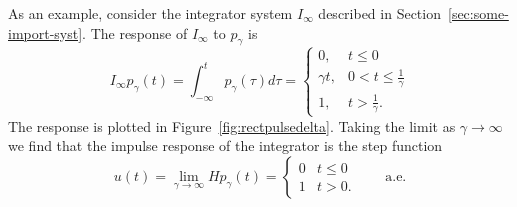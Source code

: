 
As an example, consider the integrator system $I_\infty$ described in Section~\ref{sec:some-import-syst}.  The response of $I_\infty$ to $p_\gamma$ is 
\[
I_\infty p_\gamma(t) = \int_{-\infty}^{t} p_\gamma(\tau) d\tau = \begin{cases}
0, & t \leq 0 \\
\gamma t, & 0 < t \leq \frac{1}{\gamma} \\
1, & t > \frac{1}{\gamma}.
\end{cases}
\]
The response is plotted in Figure~\ref{fig:rectpulsedelta}.  Taking the limit as $\gamma \rightarrow\infty$ we find that the impulse response of the integrator is the step function
\begin{equation}\label{eq:utimprespstep}
u(t) = \lim_{\gamma\rightarrow\infty} H p_\gamma(t) = \begin{cases}
0 & t \leq 0 \\
1 & t > 0.
\end{cases} \qquad \text{a.e.}
\end{equation}


